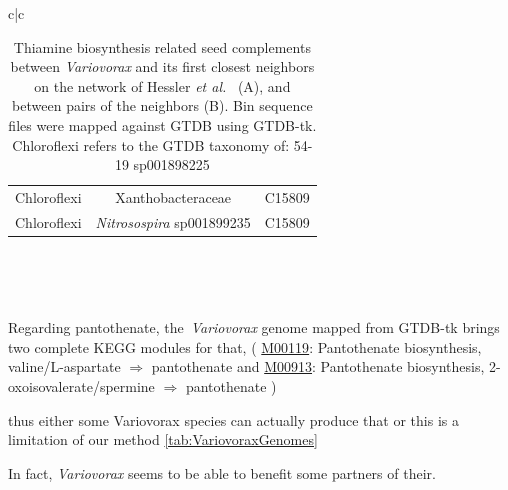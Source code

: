 \documentclass[sn-mathphys,Numbered]{sn-jnl}  %
\theoremstyle{thmstyleone}%
\theoremstyle{thmstyletwo}%
\theoremstyle{thmstylethree}%
\begin{document}
\begin{table}[ht]
\begin{minipage}{\linewidth}
\begin{adjustbox}{width=1.3\textwidth,center=\textwidth}
\begin{tabular}{c|c}
\begin{tabular}{ccc}
                        Chloroflexi & Xanthobacteraceae & C15809 \\
                        Chloroflexi & \textit{Nitrosospira} sp001899235 & C15809 \\
                    \end{tabular} \\
                \end{tabular} \\
            \end{adjustbox}
        \end{minipage}
        \caption{ Thiamine biosynthesis related seed complements between \textit{Variovorax} and its first closest neighbors on the network of Hessler \textit{et al.}~\cite{hessler2023vitamin} (A), and between pairs of the neighbors (B).
        Bin sequence files were mapped against GTDB using GTDB-tk. 
        Chloroflexi refers to the GTDB taxonomy of: 54-19 sp001898225
        }
        \label{tab:Variovorax}
        \end{table}






        Regarding pantothenate, the~\textit{Variovorax} genome mapped from GTDB-tk 
        brings two complete KEGG modules for that, (
            \href{https://www.genome.jp/module/M00119+K01918+K00826+K00077+K00606}{M00119}: Pantothenate biosynthesis, valine/L-aspartate $\Rightarrow$ pantothenate and 
            \href{https://www.genome.jp/module/M00913+K01918+K00077+K00128+K00606}{M00913}: Pantothenate biosynthesis, 2-oxoisovalerate/spermine $\Rightarrow$ pantothenate
        )


        thus either some Variovorax species can actually produce that or this is a limitation of our method \ref{tab:VariovoraxGenomes}

        In fact, \textit{Variovorax} seems to be able to benefit some partners of their. 
\end{document}
